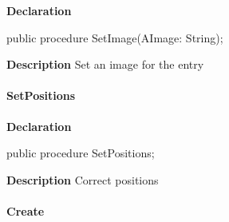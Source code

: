 \documentclass{report}
\newif\ifpdf
\begin{document}
\label{common.TListEntry-SetImage}
\begin{list}{}{
\setlength{\itemindent}{0cm}
\setlength{\listparindent}{0cm}
\setlength{\leftmargin}{\evensidemargin}
\addtolength{\leftmargin}{\tmplength}
\settowidth{\labelsep}{X}
\addtolength{\leftmargin}{\labelsep}
\setlength{\labelwidth}{\tmplength}
}
\item[\textbf{Declaration}\hfill]
\ifpdf
\begin{flushleft}
\fi
\begin{ttfamily}
public procedure SetImage(AImage: String);\end{ttfamily}

\ifpdf
\end{flushleft}
\fi

\par
\item[\textbf{Description}]
Set an image for the entry

\end{list}
\paragraph*{SetPositions}\hspace*{\fill}

\label{common.TListEntry-SetPositions}
\begin{list}{}{
\setlength{\itemindent}{0cm}
\setlength{\listparindent}{0cm}
\setlength{\leftmargin}{\evensidemargin}
\addtolength{\leftmargin}{\tmplength}
\settowidth{\labelsep}{X}
\addtolength{\leftmargin}{\labelsep}
\setlength{\labelwidth}{\tmplength}
}
\item[\textbf{Declaration}\hfill]
\ifpdf
\begin{flushleft}
\fi
\begin{ttfamily}
public procedure SetPositions;\end{ttfamily}

\ifpdf
\end{flushleft}
\fi

\par
\item[\textbf{Description}]
Correct positions

\end{list}
\paragraph*{Create}\hspace*{\fill}
\end{document}
